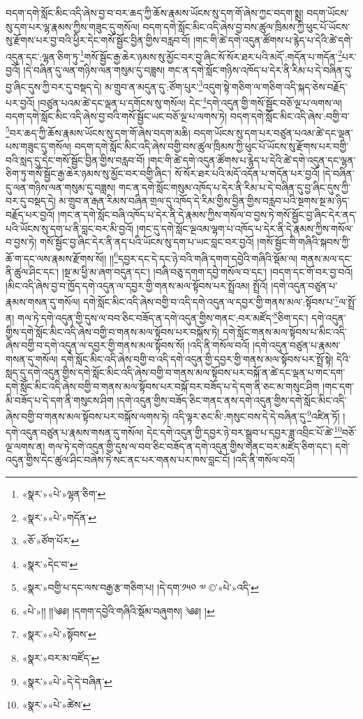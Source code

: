 བདག་དགེ་སློང་མིང་འདི་ཞེས་བྱ་བ་བར་ཆད་ཀྱི་ཆོས་རྣམས་ཡོངས་སུ་དག་གོ་ཞེས་ཀྱང་བདག་སྨྲ། བདག་ཡོངས་སུ་དག་པར་ལྷ་རྣམས་ཀྱིས་གཟུང་དུ་གསོལ། བདག་དགེ་སློང་མིང་འདི་ཞེས་བྱ་བས་ཚུལ་ཁྲིམས་ཀྱི་ཕུང་པོ་ཡོངས་སུ་རྫོགས་པར་བྱ་བའི་ཕྱིར་དེང་གསོ་སྦྱོང་བྱིན་གྱིས་བརླབ་བོ། །གང་གི་ཚེ་དགེ་འདུན་ཚོགས་པ་རྙེད་པ་དེའི་ཚེ་དགེ་འདུན་དང་:ལྷན་ཅིག་ཏུ་\footnote{«སྣར་»«པེ་»ལྷན་ཅིག་}གསོ་སྦྱོང་རྒྱ་ཆེར་ཉམས་སུ་མྱོང་བར་བྱ་ཞིང་སོ་སོར་ཐར་པའི་མདོ་:གདོན་པ་གདོན་\footnote{«སྣར་»«པེ་»གདོན་}པར་བྱའོ། །དེ་བཞིན་དུ་ལན་གཉིས་ལན་གསུམ་དུ་བཟླས། གང་ན་དགེ་སློང་གཉིས་འཁོད་པ་དེར་ནི་རིམ་པ་དེ་བཞིན་དུ་བྱ་ཞིང་དུས་ཀྱི་བར་དུ་བསྡད་དེ། མ་གྲུབ་ན་མདུན་དུ་:ཙོག་པུར་\footnote{«ཅོ་»ཙོག་པོར་}འདུག་སྟེ་གཅིག་ལ་གཅིག་འདི་སྐད་ཅེས་བརྗོད་པར་བྱའོ། །བཙུན་པའམ་ཚེ་དང་ལྡན་པ་དགོངས་སུ་གསོལ། དེང་\footnote{«སྣར་»དེང་བ་}དགེ་འདུན་གྱི་གསོ་སྦྱོང་བཅོ་ལྔ་པ་ལགས་ལ། བདག་དགེ་སློང་མིང་འདི་ཞེས་བྱ་བའི་གསོ་སྦྱོང་ཡང་བཅོ་ལྔ་པ་ལགས་ཏེ། བདག་དགེ་སློང་མིང་འདི་ཞེས་:བགྱི་བ་\footnote{«སྣར་»བགྱི་པ་དང་ལས་བརྒྱ་རྩ་གཅིག་པ། །དེ་དག་༡༥༠ ༧ ©་«པེ་»འདི་}བར་ཆད་ཀྱི་ཆོས་རྣམས་ཡོངས་སུ་དག་གོ་ཞེས་བདག་མཆི། བདག་ཡོངས་སུ་དག་པར་བཙུན་པའམ་ཚེ་དང་ལྡན་པས་གཟུང་དུ་གསོལ། བདག་དགེ་སློང་མིང་འདི་ཞེས་བགྱི་བས་ཚུལ་ཁྲིམས་ཀྱི་ཕུང་པོ་ཡོངས་སུ་རྫོགས་པར་བགྱི་བའི་སླད་དུ་དེང་གསོ་སྦྱོང་བྱིན་གྱིས་བརླབ་བོ། །གང་གི་ཚེ་དགེ་འདུན་ཚོགས་པ་རྙེད་པ་དེའི་ཚེ་དགེ་འདུན་དང་ལྷན་ཅིག་ཏུ་གསོ་སྦྱོང་རྒྱ་ཆེར་ཉམས་སུ་མྱོང་བར་བགྱི་ཞིང་། སོ་སོར་ཐར་པའི་མདོ་འདོན་པ་གདོན་པར་བྱའོ། །དེ་བཞིན་དུ་ལན་གཉིས་ལན་གསུམ་དུ་བཟླས། གང་ན་དགེ་སློང་གསུམ་འཁོད་པ་དེར་ནི་རིམ་པ་དེ་བཞིན་དུ་བྱ་ཞིང་དུས་ཀྱི་བར་དུ་བསྡད་དེ། མ་གྲུབ་ན་རྒན་རིམས་བཞིན་གྲལ་དུ་འཁོད་དེ་རིམ་གྱིས་བྱིན་གྱིས་བརླབ་པའི་སྔགས་སྔ་མ་ཉིད་བརྗོད་པར་བྱའོ། །གང་ན་དགེ་སློང་བཞི་འཁོད་པ་དེར་ནི་དེ་རྣམས་ཀྱིས་གསོལ་བ་བྱས་ཏེ་གསོ་སྦྱོང་བྱ་ཞིང་དེར་ནད་པའི་ཡོངས་སུ་དག་པ་ནི་བླང་བར་མི་བྱའོ། །གང་དུ་དགེ་སློང་ལྔའམ་ལྷག་པ་འཁོད་པ་དེར་ནི་དེ་རྣམས་ཀྱིས་གསོལ་བ་བྱས་ཏེ། གསོ་སྦྱོང་བྱ་ཞིང་དེར་ནི་ནད་པའི་ཡོངས་སུ་དག་པ་ཡང་བླང་བར་བྱའོ། །གསོ་སྦྱོང་གི་གཞིའི་སྐབས་ཀྱི་ཆོ་ག་དང་ལས་རྣམས་རྫོགས་སོ།། །།\footnote{«པེ་»།། །།༄༅། །དགག་དབྱེའི་གཞིའི་སྡོམ་བཞུགས། ༄༅། །}དབྱར་དང་དེ་དང་ཉེ་བའི་གཞི་དགག་དབྱེའི་གཞིའི་སྡོམ་ལ། གནས་མལ་དང་ནི་ཚུལ་ཤིང་དང་། །སྔ་མ་ཕྱི་མ་ཞག་བདུན་དང་། །བཞི་བཅུ་དགག་དབྱེ་གསོལ་བ་དང་། །བདག་དང་གོ་བར་བྱ་བའོ། །མིང་འདི་ཞེས་བྱ་བ་ཁྱོད་དགེ་འདུན་ལ་དབྱར་གྱི་གནས་མལ་སྟོབས་པར་སྤྲོའམ། སྤྲོའོ། །དགེ་འདུན་བཙུན་པ་རྣམས་གསན་དུ་གསོལ། དགེ་སློང་མིང་འདི་ཞེས་བགྱི་བ་འདི་དགེ་འདུན་ལ་དབྱར་གྱི་གནས་མལ་:སྟོབས་པ་\footnote{«སྣར་»«པེ་»སྟོབས་}ལ་སྤྲོ་ན། གལ་ཏེ་དགེ་འདུན་གྱི་དུས་ལ་བབ་ཅིང་བཟོད་ན་དགེ་འདུན་གྱིས་གནང་:བར་མཛོད་\footnote{«སྣར་»བར་མ་བཛོད་}ཅིག་དང་། དགེ་འདུན་གྱིས་དགེ་སློང་མིང་འདི་ཞེས་བགྱི་བ་གནས་མལ་སྟོབས་པར་བསྐོས་ཏེ། དགེ་སློང་གནས་མལ་སྟོབས་པ་མིང་འདི་ཞེས་བགྱི་བ་དགེ་འདུན་ལ་དབྱར་གྱི་གནས་མལ་སྟོབས་སོ། །འདི་ནི་གསོལ་བའོ། །དགེ་འདུན་བཙུན་པ་རྣམས་གསན་དུ་གསོལ། དགེ་སློང་མིང་འདི་ཞེས་བགྱི་བ་འདི་དགེ་འདུན་གྱི་དབྱར་གྱི་གནས་མལ་སྟོབས་པར་སྤྲོ་སྟེ། དེའི་སླད་དུ་དགེ་འདུན་གྱིས་དགེ་སློང་མིང་འདི་ཞེས་བགྱི་བ་གནས་མལ་སྟོབས་པར་བསྐོ་ན་ཚེ་དང་ལྡན་པ་གང་དག་དགེ་སློང་མིང་འདི་ཞེས་བགྱི་བ་གནས་མལ་སྟོབས་པར་བསྐོ་བར་བཟོད་པ་དེ་དག་ནི་ཅང་མ་གསུང་ཤིག །གང་དག་མི་བཟོད་པ་དེ་དག་ནི་གསུངས་ཤིག །དགེ་འདུན་གྱིས་བཟོད་ཅིང་གནང་ནས་དགེ་འདུན་གྱིས་དགེ་སློང་མིང་འདི་ཞེས་བགྱི་བ་གནས་མལ་སྟོབས་པར་བསྐོས་ལགས་ཏེ། འདི་ལྟར་ཅང་མི་:གསུང་བས་དེ་དེ་བཞིན་དུ་\footnote{«སྣར་»«པེ་»དེ་དེ་བཞིན་}འཛིན་ཏོ། །དགེ་འདུན་བཙུན་པ་རྣམས་གསན་དུ་གསོལ། དེང་དགེ་འདུན་གྱི་དབྱར་ཉེ་བར་སྒྲུབ་པ་དབྱར་ཟླ་འབྲིང་པོ་ཚེ་\footnote{«སྣར་»«པེ་»ཚེས་}བཅོ་ལྔ་ལགས་ན། གལ་ཏེ་དགེ་འདུན་གྱི་དུས་ལ་བབ་ཅིང་བཟོད་ན་དགེ་འདུན་གྱིས་གནང་བར་མཛོད་ཅིག་དང་། དགེ་འདུན་གྱིས་དེང་ཚུལ་ཤིང་བཞེས་ཏེ་སང་ནང་པར་གནས་པར་ཁས་བླང་ངོ། །འདི་ནི་གསོལ་བའོ། 